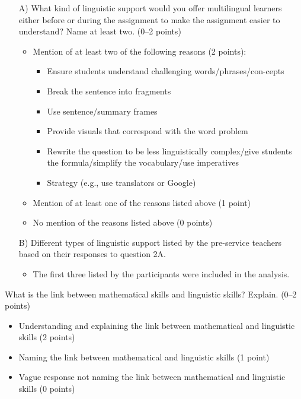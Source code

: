 \documentclass[output=paper]{langscibook}
\begin{document}
\begin{itemize}
	\item[A)] What kind of linguistic support would you offer multilingual learners either before or during the assignment to make the assignment easier to understand? Name at least two. (0–2 points)
		\begin{itemize} 
			\item Mention of at least two of the following reasons (2 points): 
				\begin{itemize}
					\item Ensure students understand challenging words/phrases/con\hyp cepts
					\item Break the sentence into fragments
					\item Use sentence/summary frames
					\item Provide visuals that correspond with the word problem
					\item Rewrite the question to be less linguistically complex/give students the formula/simplify the vocabulary/use imperatives
					\item Strategy (e.g., use translators or Google)
				\end{itemize}
			\item Mention of at least one of the reasons listed above (1 point)
			\item No mention of the reasons listed above (0 points)
		\end{itemize}
	\item[B)] Different types of linguistic support listed by the pre-service teachers based on their responses to question 2A.
		\begin{itemize}
			\item The first three listed by the participants were included in the analysis.
		\end{itemize}
\end{itemize}


What is the link between mathematical skills and linguistic skills? Explain. (0–2 points) 
\begin{itemize}
\item Understanding and explaining the link between mathematical and linguistic skills (2 points)
\item Naming the link between mathematical and linguistic skills  (1 point)
\item Vague response not naming the link between mathematical and linguistic skills (0 points)
\end{itemize}
\end{document}

